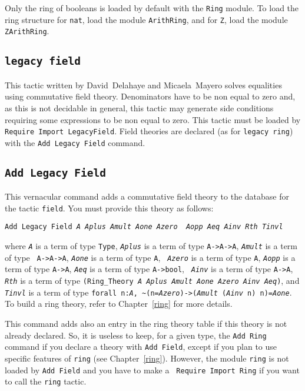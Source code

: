 \Warning Only the ring of booleans is loaded by default with the
\texttt{Ring} module. To load the ring structure for \texttt{nat},
load the module \texttt{ArithRing}, and for \texttt{Z},
load the module \texttt{ZArithRing}.

\subsection{\tt legacy field
}

This tactic written by David~Delahaye and Micaela~Mayero solves equalities
using commutative field theory. Denominators have to be non equal to zero and,
as this is not decidable in general, this tactic may generate side conditions
requiring some expressions to be non equal to zero. This tactic must be loaded
by {\tt Require Import LegacyField}. Field theories are declared (as for
{\tt legacy ring}) with
the {\tt Add Legacy Field} command.

\subsection{\tt Add Legacy Field
}

This vernacular command adds a commutative field theory to the database for the
tactic {\tt field}. You must provide this theory as follows:
\begin{flushleft}
{\tt Add Legacy Field {\it A} {\it Aplus} {\it Amult} {\it Aone} {\it Azero} {\it
Aopp} {\it Aeq} {\it Ainv} {\it Rth} {\it Tinvl}}
\end{flushleft}
where {\tt {\it A}} is a term of type {\tt Type}, {\tt {\it Aplus}} is
a term of type {\tt A->A->A}, {\tt {\it Amult}} is a term of type {\tt
  A->A->A}, {\tt {\it Aone}} is a term of type {\tt A}, {\tt {\it
    Azero}} is a term of type {\tt A}, {\tt {\it Aopp}} is a term of
type {\tt A->A}, {\tt {\it Aeq}} is a term of type {\tt A->bool}, {\tt
  {\it Ainv}} is a term of type {\tt A->A}, {\tt {\it Rth}} is a term
of type {\tt (Ring\_Theory {\it A Aplus Amult Aone Azero Ainv Aeq})},
and {\tt {\it Tinvl}} is a term of type {\tt forall n:{\it A},
  {\~{}}(n={\it Azero})->({\it Amult} ({\it Ainv} n) n)={\it Aone}}.
To build a ring theory, refer to Chapter~\ref{ring} for more details.

This command adds also an entry in the ring theory table if this theory is not
already declared. So, it is useless to keep, for a given type, the {\tt Add
Ring} command if you declare a theory with {\tt Add Field}, except if you plan
to use specific features of {\tt ring} (see Chapter~\ref{ring}). However, the
module {\tt ring} is not loaded by {\tt Add Field} and you have to make a {\tt
Require Import Ring} if you want to call the {\tt ring} tactic.

